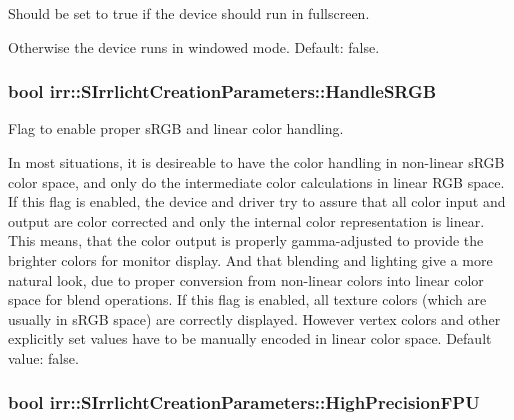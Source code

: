 Should be set to true if the device should run in fullscreen. 

Otherwise the device runs in windowed mode. Default\+: false. 
\subsubsection[{\texorpdfstring{Handle\+S\+R\+GB}{HandleSRGB}}]{\setlength{\rightskip}{0pt plus 5cm}bool irr\+::\+S\+Irrlicht\+Creation\+Parameters\+::\+Handle\+S\+R\+GB}\hypertarget{structirr_1_1SIrrlichtCreationParameters_a4808090b31a2a0e004066bded7bfefc6}{}\label{structirr_1_1SIrrlichtCreationParameters_a4808090b31a2a0e004066bded7bfefc6}


Flag to enable proper s\+R\+GB and linear color handling. 

In most situations, it is desireable to have the color handling in non-\/linear s\+R\+GB color space, and only do the intermediate color calculations in linear R\+GB space. If this flag is enabled, the device and driver try to assure that all color input and output are color corrected and only the internal color representation is linear. This means, that the color output is properly gamma-\/adjusted to provide the brighter colors for monitor display. And that blending and lighting give a more natural look, due to proper conversion from non-\/linear colors into linear color space for blend operations. If this flag is enabled, all texture colors (which are usually in s\+R\+GB space) are correctly displayed. However vertex colors and other explicitly set values have to be manually encoded in linear color space. Default value\+: false. 
\subsubsection[{\texorpdfstring{High\+Precision\+F\+PU}{HighPrecisionFPU}}]{\setlength{\rightskip}{0pt plus 5cm}bool irr\+::\+S\+Irrlicht\+Creation\+Parameters\+::\+High\+Precision\+F\+PU}\hypertarget{structirr_1_1SIrrlichtCreationParameters_ac790f1359a357f705bc2a5b24a6cc55d}{}\label{structirr_1_1SIrrlichtCreationParameters_ac790f1359a357f705bc2a5b24a6cc55d}


